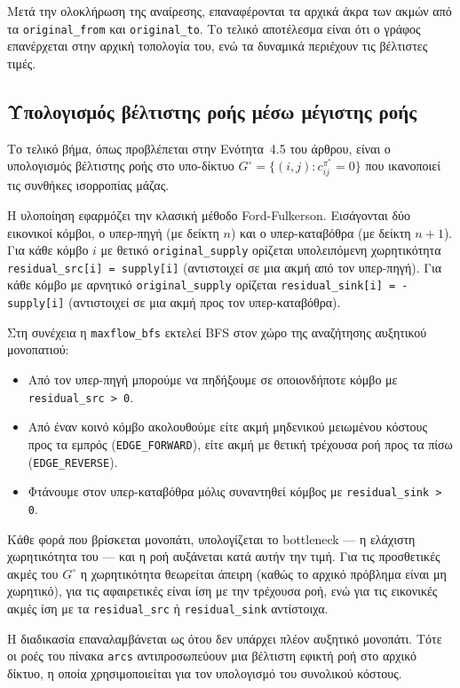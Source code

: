 \documentclass[11pt,a4paper,oneside]{report}
\let\oldsubsection\subsection
\renewcommand{\subsection}{\FloatBarrier\oldsubsection}
\begin{document}
Μετά την ολοκλήρωση της αναίρεσης, επαναφέρονται τα αρχικά άκρα των ακμών από τα \texttt{original\_from} και \texttt{original\_to}. Το τελικό αποτέλεσμα είναι ότι ο γράφος επανέρχεται στην αρχική τοπολογία του, ενώ τα δυναμικά περιέχουν τις βέλτιστες τιμές.

\subsection{Υπολογισμός βέλτιστης ροής μέσω μέγιστης ροής}

Το τελικό βήμα, όπως προβλέπεται στην Ενότητα~4.5 του άρθρου, είναι ο υπολογισμός βέλτιστης ροής στο υπο-δίκτυο $G^{\circ} = \{(i,j) : c^{\pi^{*}}_{ij} = 0\}$ που ικανοποιεί τις συνθήκες ισορροπίας μάζας.

Η υλοποίηση εφαρμόζει την κλασική μέθοδο \textenglish{Ford-Fulkerson}. Εισάγονται δύο εικονικοί κόμβοι, ο υπερ-πηγή (με δείκτη $n$) και ο υπερ-καταβόθρα (με δείκτη $n+1$). Για κάθε κόμβο $i$ με θετικό \texttt{original\_supply} ορίζεται υπολειπόμενη χωρητικότητα \texttt{residual\_src[i] = supply[i]} (αντιστοιχεί σε μια ακμή από τον υπερ-πηγή). Για κάθε κόμβο με αρνητικό \texttt{original\_supply} ορίζεται \texttt{residual\_sink[i] = -supply[i]} (αντιστοιχεί σε μια ακμή προς τον υπερ-καταβόθρα).

Στη συνέχεια η \texttt{maxflow\_bfs} εκτελεί \textenglish{BFS} στον χώρο της αναζήτησης αυξητικού μονοπατιού:
\begin{itemize}
  \item Από τον υπερ-πηγή μπορούμε να πηδήξουμε σε οποιονδήποτε κόμβο με \texttt{residual\_src}~\texttt{> 0}.
  \item Από έναν κοινό κόμβο ακολουθούμε είτε ακμή μηδενικού μειωμένου κόστους προς τα εμπρός (\texttt{EDGE\_FORWARD}), είτε ακμή με θετική τρέχουσα ροή προς τα πίσω
  (\texttt{EDGE\_REVERSE}).
  \item Φτάνουμε στον υπερ-καταβόθρα μόλις συναντηθεί κόμβος με \texttt{residual\_sink > 0}.
\end{itemize}

Κάθε φορά που βρίσκεται μονοπάτι, υπολογίζεται το \textenglish{bottleneck} --- η ελάχιστη χωρητικότητα του --- και η ροή αυξάνεται κατά αυτήν την τιμή. Για τις προσθετικές ακμές του $G^{\circ}$ η χωρητικότητα θεωρείται άπειρη (καθώς το αρχικό πρόβλημα είναι μη χωρητικό), για τις αφαιρετικές είναι ίση με την τρέχουσα ροή, ενώ για τις εικονικές ακμές ίση με τα \texttt{residual\_src} ή \texttt{residual\_sink} αντίστοιχα.

Η διαδικασία επαναλαμβάνεται ως ότου δεν υπάρχει πλέον αυξητικό μονοπάτι. Τότε οι ροές του πίνακα \texttt{arcs} αντιπροσωπεύουν μια βέλτιστη εφικτή ροή στο αρχικό δίκτυο, η οποία χρησιμοποιείται για τον υπολογισμό του συνολικού κόστους.
\end{document}

